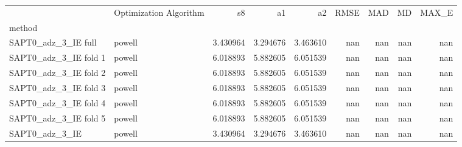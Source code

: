 \begin{tabular}{llrrrrrrr}
 & Optimization Algorithm & s8 & a1 & a2 & RMSE & MAD & MD & MAX_E \\
method &  &  &  &  &  &  &  &  \\
SAPT0_adz_3_IE full & powell & 3.430964 & 3.294676 & 3.463610 & nan & nan & nan & nan \\
SAPT0_adz_3_IE fold 1 & powell & 6.018893 & 5.882605 & 6.051539 & nan & nan & nan & nan \\
SAPT0_adz_3_IE fold 2 & powell & 6.018893 & 5.882605 & 6.051539 & nan & nan & nan & nan \\
SAPT0_adz_3_IE fold 3 & powell & 6.018893 & 5.882605 & 6.051539 & nan & nan & nan & nan \\
SAPT0_adz_3_IE fold 4 & powell & 6.018893 & 5.882605 & 6.051539 & nan & nan & nan & nan \\
SAPT0_adz_3_IE fold 5 & powell & 6.018893 & 5.882605 & 6.051539 & nan & nan & nan & nan \\
SAPT0_adz_3_IE & powell & 3.430964 & 3.294676 & 3.463610 & nan & nan & nan & nan \\
\end{tabular}

